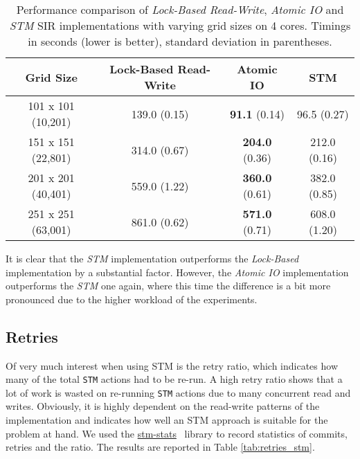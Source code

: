 \begin{table}
	\centering
  	\begin{tabular}{ c || c | c | c  }
        Grid Size           & Lock-Based Read-Write & Atomic IO              & STM            \\ \hline \hline 
   		101 x 101 (10,201)  & 139.0 (0.15)          & \textbf{91.1} (0.14)   & 96.5 (0.27)    \\ \hline
   		151 x 151 (22,801)  & 314.0 (0.67)          & \textbf{204.0} (0.36)  & 212.0 (0.16)   \\ \hline
   		201 x 201 (40,401)  & 559.0 (1.22)          & \textbf{360.0} (0.61)  & 382.0 (0.85)   \\ \hline
   		251 x 251 (63,001)  & 861.0 (0.62)          & \textbf{571.0} (0.71)  & 608.0 (1.20)   \\ \hline \hline
  	\end{tabular}

  	\caption{Performance comparison of \textit{Lock-Based Read-Write}, \textit{Atomic IO} and \textit{STM} SIR implementations with varying grid sizes on 4 cores. Timings in seconds (lower is better), standard deviation in parentheses.}
	\label{tab:sir_varyinggrid_constcores} 
\end{table}

It is clear that the \textit{STM} implementation outperforms the \textit{Lock-Based} implementation by a substantial factor. However, the \textit{Atomic IO} implementation outperforms the \textit{STM} one again, where this time the difference is a bit more pronounced due to the higher workload of the experiments. %

\subsection{Retries}
Of very much interest when using STM is the retry ratio, which indicates how many of the total \texttt{STM} actions had to be re-run. A high retry ratio shows that a lot of work is wasted on re-running \texttt{STM} actions due to many concurrent read and writes. Obviously, it is highly dependent on the read-write patterns of the implementation and indicates how well an STM approach is suitable for the problem at hand. We used the \href{http://hackage.haskell.org/package/stm-stats}{stm-stats}~\cite{stm_stats_library} library to record statistics of commits, retries and the ratio. The results are reported in Table \ref{tab:retries_stm}.

